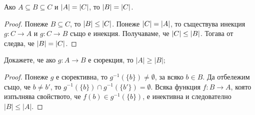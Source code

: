 \begin{cor}
  Ако $A \subseteq B \subseteq C$ и $\lvert{A}\rvert = \lvert{C}\rvert$, то $\lvert{B}\rvert = \lvert{C}\rvert$.
\end{cor}
\begin{proof}
  Понеже $B \subseteq C$, то $\lvert{B}\rvert \leq \lvert{C}\rvert$.
  Понеже $\lvert{C}\rvert = \lvert{A}\rvert$, то съществува инекция $g:C \to A$ и $g:C\to B$ също е инекция.
  Получаваме, че $\lvert{C}\rvert \leq \lvert{B}\rvert$.
  Тогава от  следва, че $\lvert{B}\rvert = \lvert{C}\rvert$.
\end{proof}


\begin{problem}
  Докажете, че ако $g:A\rightarrow B$ е сюрекция, то $|A|\geq |B|$;
\end{problem}
\begin{proof}
  Понеже $g$ е сюрективна, то $g^{-1}(\{b\}) \neq \emptyset$, за всяко $b \in B$.
  Да отбележим също, че $b \neq b'$, то $g^{-1}(\{b\}) \cap g^{-1}(\{b'\}) = \emptyset$.
  Всяка функция $f:B\to A$, която изпълнява свойството, че $f(b) \in g^{-1}(\{b\})$,
  е инективна и следователно $|B| \leq |A|$.
\end{proof}


